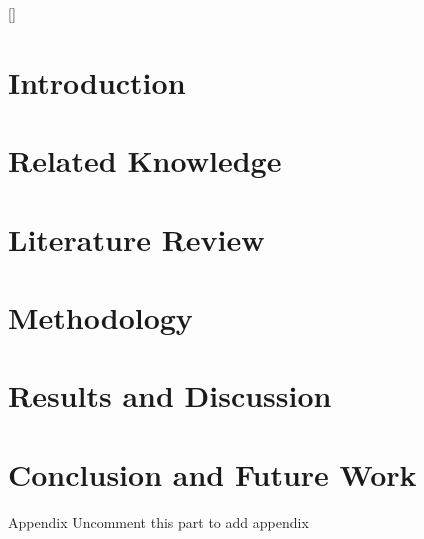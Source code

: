 \documentclass[a4paper, 12pt]{report}
\begin{document}
{
[\vfill\null\thispagestyle{empty}\clearpage]
\titlespacing{\chapter}{0pt}{0ex}{0ex}


\pagestyle{body}

\chapter{Introduction}
\label{chapter:introduction}

\newpage

\chapter{Related Knowledge}
\label{chapter:related knowledge}

\newpage

\chapter{Literature Review}
\label{chapter:literature}

\newpage

\chapter{Methodology}
\label{chapter:methodology}

\newpage

\chapter{Results and Discussion}
\label{chapter:experiment}

\newpage

\chapter{Conclusion and Future Work}
\label{chapter:conclusion}

\newpage
}


\pagestyle{plain}







Appendix
Uncomment this part to add appendix
\newpage
\pagestyle{body}
\begin{appendices}

\end{appendices}
\end{document}

